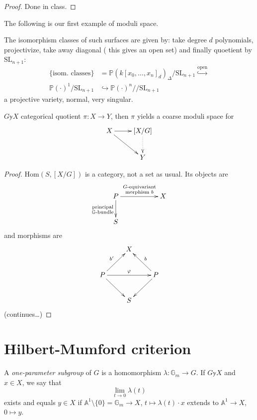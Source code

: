 \begin{proof}
Done in class.
\end{proof}

The following is our first example of moduli space.

\begin{example}
\label{example-smooth-hypersurfaces}
The isomorphism classes of such surfaces are given by: take degree $d$
polynomials, projectivize, take away diagonal ( this gives an open set) and
finally quoetient by $\text{SL}_{n+1}$:
\begin{align*}
\{\text{isom. classes}\}&=\mathbb{P}(k[x_0,\ldots,x_n]_d)_{\Delta}
/\text{SL}_{n+1}\overset{\text{open}}{\hookrightarrow }\\
\mathbb{P}(\cdot)^1/\text{SL}_{n+1}& \hookrightarrow  
\mathbb{P}(\cdot)^n/\!/\text{SL}_{n+1}
\end{align*}
a projective variety, normal, very singular.
\end{example}

\begin{remark}
\label{remark-categorial-quotient-yields-coarse-moduli-space}
$G \mathbb{y} X$ categorical quotient $\pi:X \to Y$, then $\pi$ yields a coarse
moduli space for
$$
\xymatrix{
X\ar[r]\ar[rd]& [X/G]\ar@{.>}[d]\\
&Y
}
$$
\end{remark}

\begin{proof}
$\text{Hom}(S,[X/G])$ is a category, not a set as usual. Its objects are
$$
\xymatrix{
P\ar[d]_{\substack{\text{principal} \\ \mathbb{G}\text{-bundle}}}
\ar[rr]^{\substack{G\text{-equivariant} \\ \text{morphism }b}}&&X\\
S
}
$$
and morphisms are
$$
\xymatrix{
&X\\
P\ar[ur]^{b'}\ar[rr]^\varphi \ar[dr]&  &  P\ar[ul]_b\ar[dl]\\
&S
}
$$
(continues…)
\end{proof}

\section{Hilbert-Mumford criterion}
\label{section-Hilbert-Mumford-criterion}

\begin{definition}
\label{definition-one-parameter-subgroup}
A {\it one-parameter subgroup} of  $G$ is a homomorphism
$\lambda:\mathbb{G}_m \to G$. If $G \mathbb{y} X$ and $x \in X$, we say that
$$
\lim_{t \to 0}\lambda(t) 
$$
exists and equals $y \in X$ if $\mathbb{A}^1\setminus\{0\}=\mathbb{G}_m \to X$,
$t \mapsto \lambda(t)\cdot x$ extends to $\mathbb{A}^1 \to X$, $0 \mapsto y$.
\end{definition}


